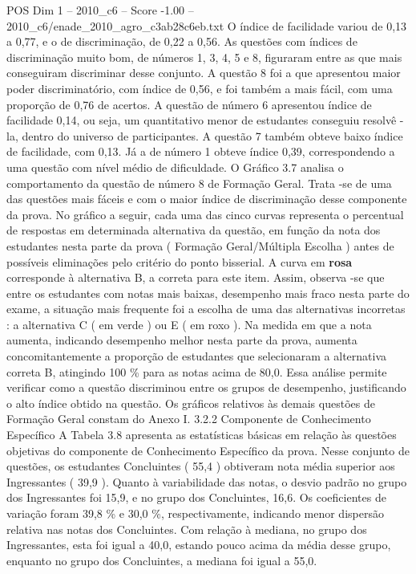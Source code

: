 \begin{textsample}{POS Dim 1 – 2010\_c6 – Score -1.00 – 2010\_c6/enade\_2010\_agro\_c3ab28c6eb.txt}
O índice de facilidade variou de 0,13 a 0,77, e o de discriminação, de 0,22 a 0,56.
As questões com índices de discriminação muito bom, de números 1, 3, 4, 5 e 8, figuraram entre as que mais conseguiram discriminar desse conjunto.
A questão 8 foi a que apresentou maior poder discriminatório, com índice de 0,56, e foi também a mais fácil, com uma proporção de 0,76 de acertos.
A questão de número 6 apresentou índice de facilidade 0,14, ou seja, um quantitativo menor de estudantes conseguiu resolvê -la, dentro do universo de participantes.
A questão 7 também obteve baixo índice de facilidade, com 0,13.
Já a de número 1 obteve índice 0,39, correspondendo a uma questão com nível médio de dificuldade.
O Gráfico 3.7 analisa o comportamento da questão de número 8 de Formação Geral.
Trata -se de uma das questões mais fáceis e com o maior índice de discriminação desse componente da prova.
No gráfico a seguir, cada uma das cinco curvas representa o percentual de respostas em determinada alternativa da questão, em função da nota dos estudantes nesta parte da prova ( Formação Geral/Múltipla Escolha ) antes de possíveis eliminações pelo critério do ponto bisserial.
A curva em \textbf{rosa} corresponde à alternativa B, a correta para este item.
Assim, observa -se que entre os estudantes com notas mais baixas, desempenho mais fraco nesta parte do exame, a situação mais frequente foi a escolha de uma das alternativas incorretas : a alternativa C ( em verde ) ou E ( em roxo ).
Na medida em que a nota aumenta, indicando desempenho melhor nesta parte da prova, aumenta concomitantemente a proporção de estudantes que selecionaram a alternativa correta B, atingindo 100 \% para as notas acima de 80,0.
Essa análise permite verificar como a questão discriminou entre os grupos de desempenho, justificando o alto índice obtido na questão.
Os gráficos relativos às demais questões de Formação Geral constam do Anexo I. 3.2.2 Componente de Conhecimento Específico A Tabela 3.8 apresenta as estatísticas básicas em relação às questões objetivas do componente de Conhecimento Específico da prova.
Nesse conjunto de questões, os estudantes Concluintes ( 55,4 ) obtiveram nota média superior aos Ingressantes ( 39,9 ).
Quanto à variabilidade das notas, o desvio padrão no grupo dos Ingressantes foi 15,9, e no grupo dos Concluintes, 16,6.
Os coeficientes de variação foram 39,8 \% e 30,0 \%, respectivamente, indicando menor dispersão relativa nas notas dos Concluintes.
Com relação à mediana, no grupo dos Ingressantes, esta foi igual a 40,0, estando pouco acima da média desse grupo, enquanto no grupo dos Concluintes, a mediana foi igual a 55,0.

\end{textsample}
